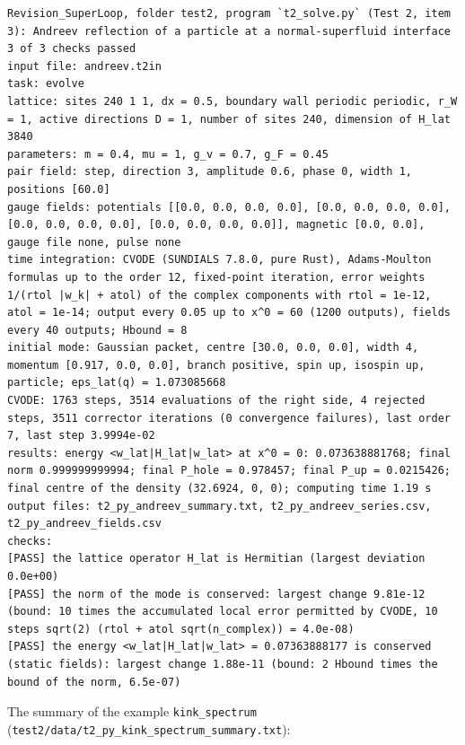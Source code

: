 \documentclass[
  10pt,
]{article}
\begin{document}
\begin{verbatim}
Revision_SuperLoop, folder test2, program `t2_solve.py` (Test 2, item 3): Andreev reflection of a particle at a normal-superfluid interface
3 of 3 checks passed
input file: andreev.t2in
task: evolve
lattice: sites 240 1 1, dx = 0.5, boundary wall periodic periodic, r_W = 1, active directions D = 1, number of sites 240, dimension of H_lat 3840
parameters: m = 0.4, mu = 1, g_v = 0.7, g_F = 0.45
pair field: step, direction 3, amplitude 0.6, phase 0, width 1, positions [60.0]
gauge fields: potentials [[0.0, 0.0, 0.0, 0.0], [0.0, 0.0, 0.0, 0.0], [0.0, 0.0, 0.0, 0.0], [0.0, 0.0, 0.0, 0.0]], magnetic [0.0, 0.0], gauge file none, pulse none
time integration: CVODE (SUNDIALS 7.8.0, pure Rust), Adams-Moulton formulas up to the order 12, fixed-point iteration, error weights 1/(rtol |w_k| + atol) of the complex components with rtol = 1e-12, atol = 1e-14; output every 0.05 up to x^0 = 60 (1200 outputs), fields every 40 outputs; Hbound = 8
initial mode: Gaussian packet, centre [30.0, 0.0, 0.0], width 4, momentum [0.917, 0.0, 0.0], branch positive, spin up, isospin up, particle; eps_lat(q) = 1.073085668
CVODE: 1763 steps, 3514 evaluations of the right side, 4 rejected steps, 3511 corrector iterations (0 convergence failures), last order 7, last step 3.9994e-02
results: energy <w_lat|H_lat|w_lat> at x^0 = 0: 0.073638881768; final norm 0.999999999994; final P_hole = 0.978457; final P_up = 0.0215426; final centre of the density (32.6924, 0, 0); computing time 1.19 s
output files: t2_py_andreev_summary.txt, t2_py_andreev_series.csv, t2_py_andreev_fields.csv
checks:
[PASS] the lattice operator H_lat is Hermitian (largest deviation 0.0e+00)
[PASS] the norm of the mode is conserved: largest change 9.81e-12 (bound: 10 times the accumulated local error permitted by CVODE, 10 steps sqrt(2) (rtol + atol sqrt(n_complex)) = 4.0e-08)
[PASS] the energy <w_lat|H_lat|w_lat> = 0.07363888177 is conserved (static fields): largest change 1.88e-11 (bound: 2 Hbound times the bound of the norm, 6.5e-07)
\end{verbatim}

The summary of the example \texttt{kink\_spectrum}
(\texttt{test2/data/t2\_py\_kink\_spectrum\_summary.txt}):
\end{document}
